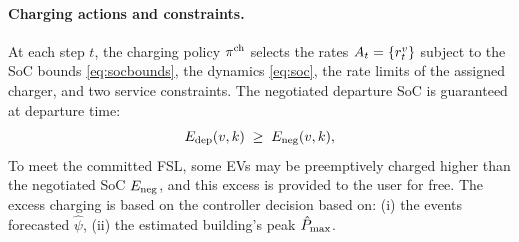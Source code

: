 \paragraph{Charging actions and constraints.} At each step $t$, the charging
policy $\pi^{\mathrm{ch}}$ selects the rates $A_{t} = \{r_{t}^{v}\}$ subject to the SoC bounds \eqref{eq:socbounds}, the dynamics \eqref{eq:soc}, the rate limits of the assigned charger, and two service constraints. The negotiated departure SoC is guaranteed at departure time:
\begin{equation}\label{eq:floor}
E_{\mathrm{dep}}(v,k) \;\ge\; E_{\mathrm{neg}}(v,k),
\end{equation}
To meet the committed FSL, some EVs may be preemptively charged higher than the negotiated SoC $E_{\mathrm{neg}}$, and this excess is provided to the user for free. The excess charging is based on the controller decision based on: (i) the events forecasted $\hat\psi$, (ii) the estimated building's peak $\hat{P}_{\max}$.




